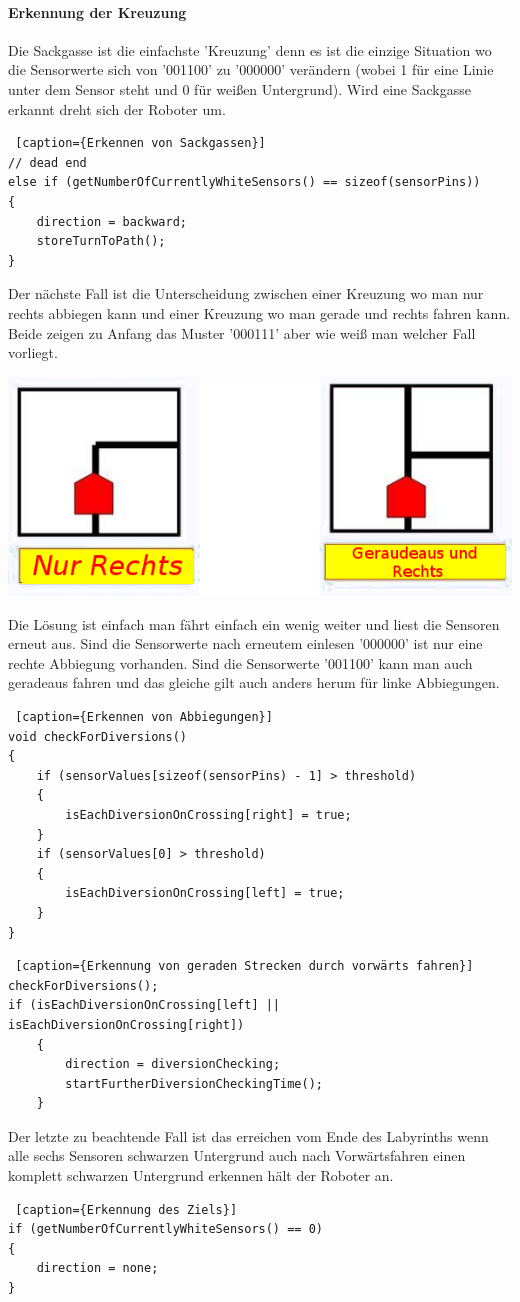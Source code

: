 \documentclass[12pt]{article}
\begin{document}
\paragraph{Erkennung der Kreuzung} Die Sackgasse ist die einfachste 'Kreuzung' denn es ist die einzige Situation wo die Sensorwerte sich von '001100' zu '000000' verändern (wobei 1 für eine Linie unter dem Sensor steht und 0 für weißen Untergrund). Wird eine Sackgasse erkannt dreht sich der Roboter um. 

\begin{lstlisting} [caption={Erkennen von Sackgassen}]
// dead end
else if (getNumberOfCurrentlyWhiteSensors() == sizeof(sensorPins))
{
    direction = backward;
    storeTurnToPath();
}
\end{lstlisting}
Der nächste Fall ist die Unterscheidung zwischen einer Kreuzung wo man nur rechts abbiegen kann und einer Kreuzung wo man gerade und rechts fahren kann. Beide zeigen zu Anfang das Muster '000111' aber wie weiß man welcher Fall vorliegt.

\includegraphics[width=1\textwidth]{images/case_right.png}

Die Lösung ist einfach man fährt einfach ein wenig weiter und liest die Sensoren erneut aus. Sind die Sensorwerte nach erneutem einlesen '000000' ist nur eine rechte Abbiegung vorhanden. Sind die Sensorwerte '001100' kann man auch geradeaus fahren und das gleiche gilt auch anders herum für linke Abbiegungen.

\begin{lstlisting} [caption={Erkennen von Abbiegungen}]
void checkForDiversions()
{
    if (sensorValues[sizeof(sensorPins) - 1] > threshold)
    {
        isEachDiversionOnCrossing[right] = true;
    }
    if (sensorValues[0] > threshold)
    {
        isEachDiversionOnCrossing[left] = true;
    }
}
\end{lstlisting}

\begin{lstlisting} [caption={Erkennung von geraden Strecken durch vorwärts fahren}]
checkForDiversions();
if (isEachDiversionOnCrossing[left] || isEachDiversionOnCrossing[right])
    {
        direction = diversionChecking;
        startFurtherDiversionCheckingTime();
    }
\end{lstlisting}
Der letzte zu beachtende Fall ist das erreichen vom Ende des Labyrinths wenn alle sechs Sensoren schwarzen Untergrund auch nach Vorwärtsfahren einen komplett schwarzen Untergrund erkennen hält der Roboter an.
\begin{lstlisting} [caption={Erkennung des Ziels}]
if (getNumberOfCurrentlyWhiteSensors() == 0)
{
    direction = none;
}
\end{lstlisting}
\end{document}
